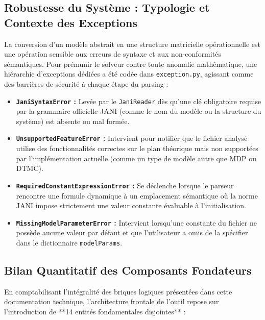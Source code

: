 \documentclass[14pt, a4paper]{extarticle}
\begin{document}
\subsection{Robustesse du Système : Typologie et Contexte des Exceptions}

La conversion d'un modèle abstrait en une structure matricielle opérationnelle est une opération sensible aux erreurs de syntaxe et aux non-conformités sémantiques. Pour prémunir le solveur contre toute anomalie mathématique, une hiérarchie d'exceptions dédiées a été codée dans \texttt{exception.py}, agissant comme des barrières de sécurité à chaque étape du parsing :

\begin{itemize}
    \item \textbf{\texttt{JaniSyntaxError} :} Levée par le \texttt{JaniReader} dès qu'une clé obligatoire requise par la grammaire officielle JANI (comme le nom du modèle ou la structure du système) est absente ou mal formée.
    \item \textbf{\texttt{UnsupportedFeatureError} :} Intervient pour notifier que le fichier analysé utilise des fonctionnalités correctes sur le plan théorique mais non supportées par l'implémentation actuelle (comme un type de modèle autre que MDP ou DTMC).
    \item \textbf{\texttt{RequiredConstantExpressionError} :} Se déclenche lorsque le parseur rencontre une formule dynamique à un emplacement sémantique où la norme JANI impose strictement une valeur constante évaluable à l'initialisation.
    \item \textbf{\texttt{MissingModelParameterError} :} Intervient lorsqu'une constante du fichier ne possède aucune valeur par défaut et que l'utilisateur a omis de la spécifier dans le dictionnaire \texttt{modelParams}.
\end{itemize}

\subsection{Bilan Quantitatif des Composants Fondateurs}

En comptabilisant l'intégralité des briques logiques présentées dans cette documentation technique, l'architecture frontale de l'outil repose sur l'introduction de **14 entités fondamentales disjointes** :
\end{document}
